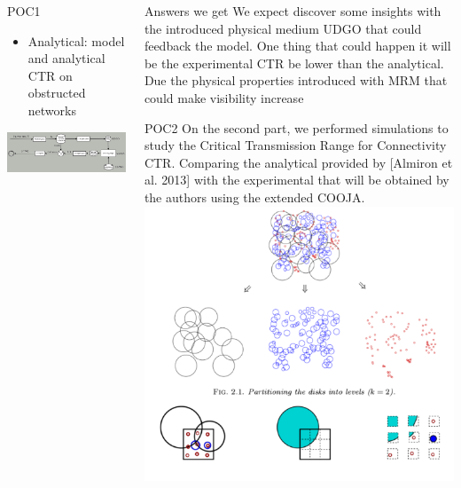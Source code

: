 \documentclass[final,hyperref={pdfpagelabels=false}]{beamer}
\begin{document}
\begin{frame}{}
\begin{columns}[t]
\begin{column}{.48\linewidth}
\begin{block}{POC1}
\begin{itemize}
          \item Analytical: model and analytical CTR on obstructed networks
          \end{itemize}          
          \includegraphics[width=1.0\linewidth]{sim-cycle}
        \end{block}
      \end{column}
      \begin{column}{.48\linewidth}
        \begin{block}{Answers we get}        
          \centering
          We expect discover some insights with the introduced physical medium UDGO that could
          feedback the model. One thing that could happen it will be the experimental CTR be lower
          than the analytical. Due the physical properties introduced with MRM that could make
          visibility increase\newline
        \end{block}  
        \begin{block}{POC2}
          \centering
          On the second part, we performed simulations to study the Critical Transmission Range for Connectivity CTR. Comparing the analytical provided by [Almiron et al. 2013] with the experimental that will be obtained by the authors using the extended COOJA. \newline
          \includegraphics[width=0.75\linewidth]{ptasgig}

\end{block}
\end{column}
\end{columns}
\end{frame}
\end{document}
